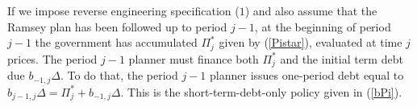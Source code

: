 \documentclass[12pt]{article}
\newcommand{\WJ}[1]{{\textcolor{red}{#1}}}
\newcommand{\TS}[1]{{\textcolor{magenta}{#1}}}
\begin{document}
If we impose reverse engineering specification ($1$) and also
assume  that the Ramsey plan has been followed up to period $j-1$, {at the beginning of  period $j-1$ the government has accumulated} 
$\Pi_j^*$ given by (\ref{Pistar}), evaluated at time $j$ prices. 
The period $j-1$ planner must finance both $\Pi_j^*$ and the initial term  debt due  $b_{-1, j}\Delta$.  To do that, the period $j-1$ planner    issues  one-period debt equal to $b_{j-1, j}\Delta = \Pi_j^*+b_{-1, j}\Delta$. This is  the short-term-debt-only policy given in (\ref{bPi}).
\end{document}

